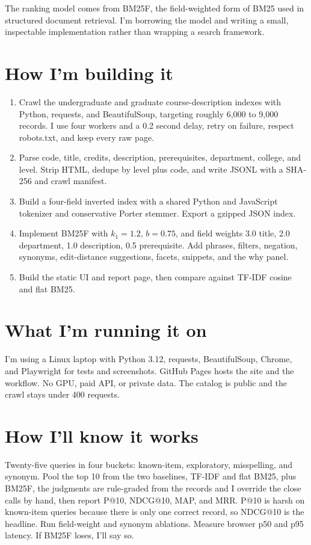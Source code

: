 \documentclass[10pt]{article}
\begin{document}
The ranking model comes from BM25F, the field-weighted form of BM25 used in structured document retrieval. I'm borrowing the model and writing a small, inspectable implementation rather than wrapping a search framework.

\section*{How I'm building it}
\begin{enumerate}[leftmargin=1.3em,itemsep=1pt]
  \item Crawl the undergraduate and graduate course-description indexes with Python, requests, and BeautifulSoup, targeting roughly 6,000 to 9,000 records. I use four workers and a 0.2 second delay, retry on failure, respect robots.txt, and keep every raw page.
  \item Parse code, title, credits, description, prerequisites, department, college, and level. Strip HTML, dedupe by level plus code, and write JSONL with a SHA-256 and crawl manifest.
  \item Build a four-field inverted index with a shared Python and JavaScript tokenizer and conservative Porter stemmer. Export a gzipped JSON index.
  \item Implement BM25F with $k_1=1.2$, $b=0.75$, and field weights 3.0 title, 2.0 department, 1.0 description, 0.5 prerequisite. Add phrases, filters, negation, synonyms, edit-distance suggestions, facets, snippets, and the why panel.
  \item Build the static UI and report page, then compare against TF-IDF cosine and flat BM25.
\end{enumerate}

\section*{What I'm running it on}
I'm using a Linux laptop with Python 3.12, requests, BeautifulSoup, Chrome, and Playwright for tests and screenshots. GitHub Pages hosts the site and the workflow. No GPU, paid API, or private data. The catalog is public and the crawl stays under 400 requests.

\section*{How I'll know it works}
Twenty-five queries in four buckets: known-item, exploratory, misspelling, and synonym. Pool the top 10 from the two baselines, TF-IDF and flat BM25, plus BM25F, the judgments are rule-graded from the records and I override the close calls by hand, then report P@10, NDCG@10, MAP, and MRR. P@10 is harsh on known-item queries because there is only one correct record, so NDCG@10 is the headline. Run field-weight and synonym ablations. Measure browser p50 and p95 latency. If BM25F loses, I'll say so.
\end{document}
